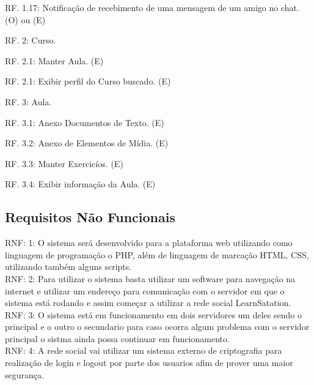 \documentclass[12pt,a4paper,onecolumn,titlepage]{article}
\begin{document}
RF. 1.17: Notificação de recebimento de uma mensagem de um amigo no chat. (O) ou (E)

RF. 2: Curso.

RF. 2.1: Manter Aula. (E)

RF. 2.1: Exibir perfil do Curso buscado. (E)


RF. 3: Aula.

RF. 3.1: Anexo Documentos de Texto. (E)

RF. 3.2: Anexo de Elementos de Mídia. (E)

RF. 3.3: Manter Exercicíos. (E)

RF. 3.4: Exibir informação da Aula. (E)


\subsection{Requisitos Não Funcionais}



RNF: 1: O sistema será desenvolvido para a plataforma web utilizando como linguagem de programação o PHP, além de linguagem de marcação HTML, CSS, utilizando também alguns scripts.\\

RNF: 2: Para utilizar o sistema basta utilizar um software para navegação na internet e utilizar um endereço para comunicação com o servidor em que o sistema está rodando e assim começar a utilizar a rede social LearnSatation.\\

RNF: 3: O sistema está em funcionamento em dois servidores um deles sendo o principal e o outro o secundario para caso ocorra algum problema com o servidor principal o sistma ainda possa continuar em funcionamento.\\

RNF: 4: A rede social vai utilizar um sistema externo de criptografia para realização de login e logout por parte dos usuarios afim de prover uma maior segurança.\\

\end{document}
